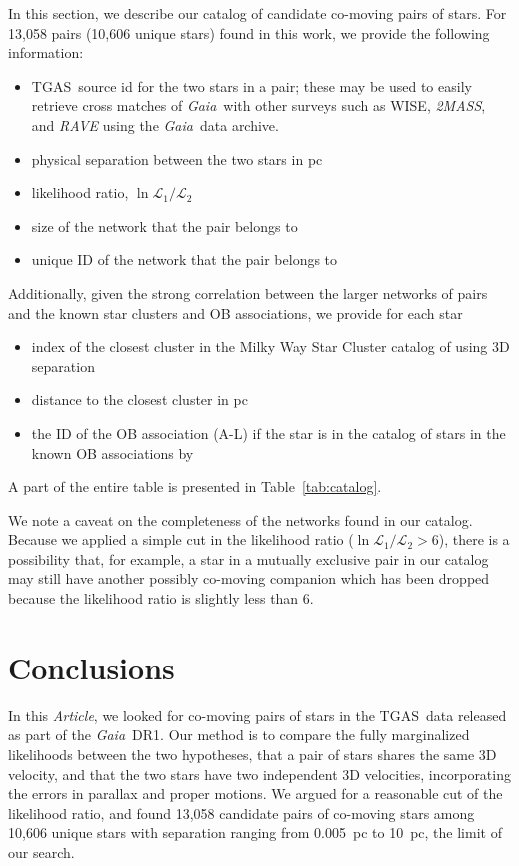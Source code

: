 \documentclass[manuscript, letterpaper]{aastex6}
\newcommand{\project}[1]{\textsl{#1}}
\newcommand{\acronym}[1]{{\small{#1}}}
\newcommand{\gaia}{\project{Gaia}}
\newcommand{\rave}{\project{\acronym{RAVE}}}
\newcommand{\tmass}{\project{\acronym{2MASS}}}
\newcommand{\documentname}{\textsl{Article}}
\newcommand{\tgas}{\acronym{TGAS}}
\begin{document}
In this section, we describe our catalog of candidate co-moving pairs of stars.
For 13,058 pairs (10,606 unique stars) found in this work,
we provide the following information:
%
\begin{itemize}
  \item \tgas\ source id for the two stars in a pair; these may be used to easily
  retrieve cross matches of \gaia\ with other surveys such as WISE, \tmass, and \rave
  using the \gaia\ data archive.
  \item physical separation between the two stars in pc
  \item likelihood ratio, $\ln \mathcal{L}_1 /\mathcal{L}_2$
  \item size of the network that the pair belongs to
  \item unique ID of the network that the pair belongs to
\end{itemize}
%
Additionally, given the strong correlation between the larger networks of pairs
and the known star clusters and OB associations, we provide for each star
%
\begin{itemize}
  \item index of the closest cluster in the Milky Way Star Cluster catalog of
  \citet{Kharchenko:2016aa} using 3D separation
  \item distance to the closest cluster in pc
  \item the ID of the OB association (A-L) if the star is in the catalog of
  stars in the known OB associations by \citet{de-Zeeuw:1999aa}
\end{itemize}
%
A part of the entire table is presented in Table~\ref{tab:catalog}.



We note a caveat on the completeness of the networks found in our catalog.
Because we applied a simple cut in the likelihood ratio ($\ln \mathcal{L}_1 /\mathcal{L}_2>6$),
there is a possibility that, for example, a star in a mutually exclusive pair in our catalog may
still have another possibly co-moving companion which has been dropped because the likelihood ratio
is slightly less than 6.

\section{Conclusions}\label{sec:conclusions}

In this \documentname, we looked for co-moving pairs of stars in the
\tgas\ data released as part of the \gaia\ DR1.
Our method is to compare
the fully marginalized likelihoods between the two hypotheses, that a pair of
stars shares the same 3D velocity, and that the two stars have two independent
3D velocities, incorporating the errors in parallax and proper motions.
We argued for a reasonable cut of the likelihood ratio, and found
13,058 candidate pairs of co-moving stars among 10,606 unique stars
with separation ranging from 0.005~pc to 10~pc, the limit of our search.
\end{document}
